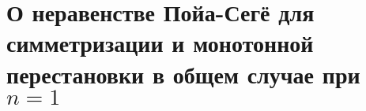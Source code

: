 \chapter{О неравенстве Пойа-Сегё для симметризации и монотонной перестановки в общем случае при $n = 1$}
\label{chapt2}





